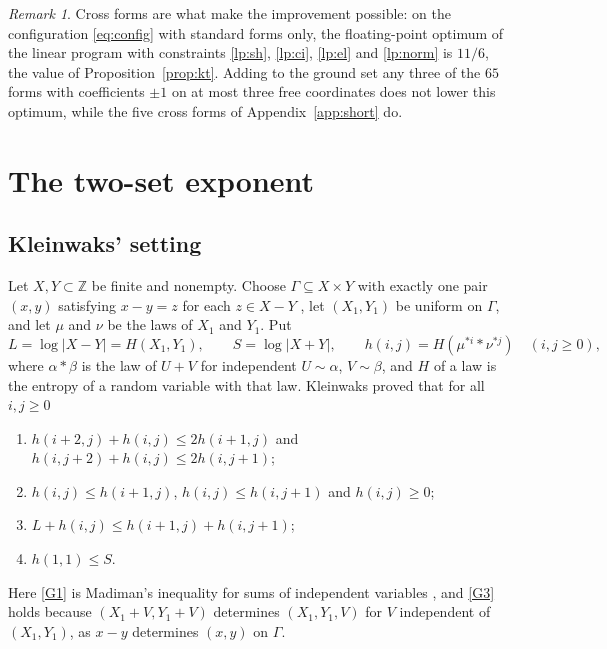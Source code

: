 \documentclass[11pt]{amsart}
\theoremstyle{definition}
\theoremstyle{remark}
\newtheorem{remark}[theorem]{Remark}
\numberwithin{equation}{section}
\newcommand{\Z}{\mathbb{Z}}
\begin{document}
\begin{remark}\label{rem:cross}
Cross forms are what make the improvement possible: on the configuration \eqref{eq:config} with standard forms only, the floating-point optimum of the linear program with constraints \ref{lp:sh}, \ref{lp:ci}, \ref{lp:el} and \ref{lp:norm} is $11/6$, the value of Proposition~\ref{prop:kt}. Adding to the ground set any three of the $65$ forms with coefficients $\pm1$ on at most three free coordinates does not lower this optimum, while the five cross forms of Appendix~\ref{app:short} do.
\end{remark}

\section{The two-set exponent}\label{sec:pair}

\subsection{Kleinwaks' setting}\label{sec:kl}
Let $X,Y\subset\Z$ be finite and nonempty. Choose $\Gamma\subseteq X\times Y$ with exactly one pair $(x,y)$ satisfying $x-y=z$ for each $z\in X-Y$ \cite[Lemma~4.1]{Kle26}, let $(X_1,Y_1)$ be uniform on $\Gamma$, and let $\mu$ and $\nu$ be the laws of $X_1$ and $Y_1$. Put
\[
L=\log|X-Y|=H(X_1,Y_1),\qquad S=\log|X+Y|,\qquad h(i,j)=H(\mu^{*i}*\nu^{*j})\quad(i,j\ge0),
\]
where $\alpha*\beta$ is the law of $U+V$ for independent $U\sim\alpha$, $V\sim\beta$, and $H$ of a law is the entropy of a random variable with that law. Kleinwaks proved \cite[Lemmas~4.2 and~4.3]{Kle26} that for all $i,j\ge0$
\begin{enumerate}[label=(G\arabic*)]
\item\label{G1} $h(i+2,j)+h(i,j)\le2h(i+1,j)$ and $h(i,j+2)+h(i,j)\le2h(i,j+1)$;
\item\label{G2} $h(i,j)\le h(i+1,j)$, $h(i,j)\le h(i,j+1)$ and $h(i,j)\ge0$;
\item\label{G3} $L+h(i,j)\le h(i+1,j)+h(i,j+1)$;
\item\label{G4} $h(1,1)\le S$.
\end{enumerate}
Here \ref{G1} is Madiman's inequality for sums of independent variables \cite{Mad08}, and \ref{G3} holds because $(X_1+V,Y_1+V)$ determines $(X_1,Y_1,V)$ for $V$ independent of $(X_1,Y_1)$, as $x-y$ determines $(x,y)$ on $\Gamma$.
\end{document}
